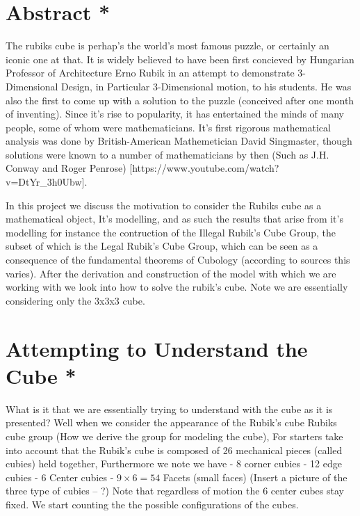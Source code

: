\section{Abstract *}\label{abstract}

The rubiks cube is perhap's the world's most famous puzzle, or certainly
an iconic one at that. It is widely believed to have been first
concieved by Hungarian Professor of Architecture Erno Rubik in an
attempt to demonstrate 3-Dimensional Design, in Particular 3-Dimensional
motion, to his students. He was also the first to come up with a
solution to the puzzle (conceived after one month of inventing). Since
it's rise to popularity, it has entertained the minds of many people,
some of whom were mathematicians. It's first rigorous mathematical
analysis was done by British-American Mathemetician David Singmaster,
though solutions were known to a number of mathematicians by then (Such
as J.H. Conway and Roger Penrose)
{[}https://www.youtube.com/watch?v=DtYr\_3h0Ubw{]}.

In this project we discuss the motivation to consider the Rubiks cube as
a mathematical object, It's modelling, and as such the results that
arise from it's modelling for instance the contruction of the Illegal
Rubik's Cube Group, the subset of which is the Legal Rubik's Cube Group,
which can be seen as a consequence of the fundamental theorems of
Cubology (according to sources this varies). After the derivation and
construction of the model with which we are working with we look into
how to solve the rubik's cube. Note we are essentially considering only
the 3x3x3 cube.

\section{Attempting to Understand the Cube
*}\label{attempting-to-understand-the-cube}

What is it that we are essentially trying to understand with the cube as
it is presented? Well when we consider the appearance of the Rubik's
cube Rubiks cube group (How we derive the group for modeling the cube),
For starters take into account that the Rubik's cube is composed of 26
mechanical pieces (called cubies) held together, Furthermore we note we
have - 8 corner cubies - 12 edge cubies - 6 Center cubies -
\(9 \times 6 = 54\) Facets (small faces) (Insert a picture of the three
type of cubies -- ?) Note that regardless of motion the 6 center cubes
stay fixed. We start counting the the possible configurations of the
cubes.

